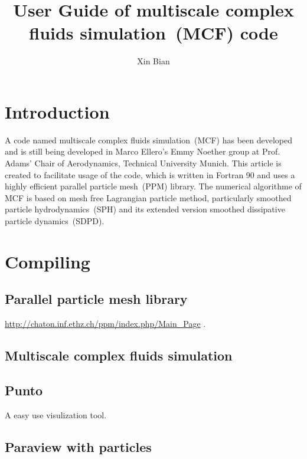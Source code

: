 \documentclass[a4paper,10pt]{article}
\title{User Guide of multiscale complex fluids simulation~(MCF) code}
\author{Xin Bian}
\begin{document}
\maketitle

\tableofcontents

\begin{abstract}
\end{abstract}

\section{Introduction}
A code named multiscale complex fluids simulation~(MCF)
has been developed and is still being developed in
Marco Ellero's Emmy Noether group
at Prof. Adams' Chair of Aerodynamics,
Technical University Munich.
This article is created
to facilitate usage of the code,
which is written in Fortran 90 and
uses a highly efficient parallel particle mesh~(PPM)\cite{Sbalzarini2006} library.
The numerical algorithme of MCF is based on
mesh free Lagrangian particle method,
particularly smoothed particle hydrodynamics~(SPH)
and its extended version smoothed dissipative particle dynamics~(SDPD).

\section{Compiling}

\subsection{Parallel particle mesh library}
\url{http://chaton.inf.ethz.ch/ppm/index.php/Main_Page}
\cite{Sbalzarini2006}.
\subsection{Multiscale complex fluids simulation}

\subsection{Punto}
A easy use visulization tool.

\subsection{Paraview with particles}
\end{document}
